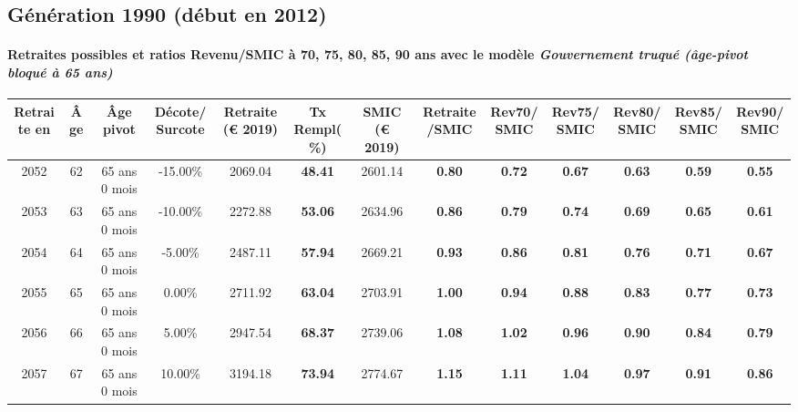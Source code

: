 \newpage 
 
\subsection{Génération 1990 (début en 2012)} 

\paragraph{Retraites possibles et ratios Revenu/SMIC à 70, 75, 80, 85, 90 ans avec le modèle \emph{Gouvernement truqué (âge-pivot bloqué à 65 ans)}}  
 
{ \scriptsize \begin{center} 
\begin{tabular}[htb]{|c|c||c|c||c|c||c||c|c|c|c|c|c|} 
\hline 
 Retraite en &  Âge &  Âge pivot &  Décote/Surcote &  Retraite (\euro{} 2019) &  Tx Rempl(\%) &  SMIC (\euro{} 2019) &  Retraite/SMIC &  Rev70/SMIC &  Rev75/SMIC &  Rev80/SMIC &  Rev85/SMIC &  Rev90/SMIC \\ 
\hline \hline 
 2052 &  62 &  65 ans 0 mois &  -15.00\% &  2069.04 &  {\bf 48.41} &  2601.14 &  {\bf {\color{red} 0.80}} &  {\bf {\color{red} 0.72}} &  {\bf {\color{red} 0.67}} &  {\bf {\color{red} 0.63}} &  {\bf {\color{red} 0.59}} &  {\bf {\color{red} 0.55}} \\ 
\hline 
 2053 &  63 &  65 ans 0 mois &  -10.00\% &  2272.88 &  {\bf 53.06} &  2634.96 &  {\bf {\color{red} 0.86}} &  {\bf {\color{red} 0.79}} &  {\bf {\color{red} 0.74}} &  {\bf {\color{red} 0.69}} &  {\bf {\color{red} 0.65}} &  {\bf {\color{red} 0.61}} \\ 
\hline 
 2054 &  64 &  65 ans 0 mois &  -5.00\% &  2487.11 &  {\bf 57.94} &  2669.21 &  {\bf {\color{red} 0.93}} &  {\bf {\color{red} 0.86}} &  {\bf {\color{red} 0.81}} &  {\bf {\color{red} 0.76}} &  {\bf {\color{red} 0.71}} &  {\bf {\color{red} 0.67}} \\ 
\hline 
 2055 &  65 &  65 ans 0 mois &  0.00\% &  2711.92 &  {\bf 63.04} &  2703.91 &  {\bf 1.00} &  {\bf {\color{red} 0.94}} &  {\bf {\color{red} 0.88}} &  {\bf {\color{red} 0.83}} &  {\bf {\color{red} 0.77}} &  {\bf {\color{red} 0.73}} \\ 
\hline 
 2056 &  66 &  65 ans 0 mois &  5.00\% &  2947.54 &  {\bf 68.37} &  2739.06 &  {\bf 1.08} &  {\bf 1.02} &  {\bf {\color{red} 0.96}} &  {\bf {\color{red} 0.90}} &  {\bf {\color{red} 0.84}} &  {\bf {\color{red} 0.79}} \\ 
\hline 
 2057 &  67 &  65 ans 0 mois &  10.00\% &  3194.18 &  {\bf 73.94} &  2774.67 &  {\bf 1.15} &  {\bf 1.11} &  {\bf 1.04} &  {\bf {\color{red} 0.97}} &  {\bf {\color{red} 0.91}} &  {\bf {\color{red} 0.86}} \\ 
\hline 
\hline 
\end{tabular} 
\end{center} } 
